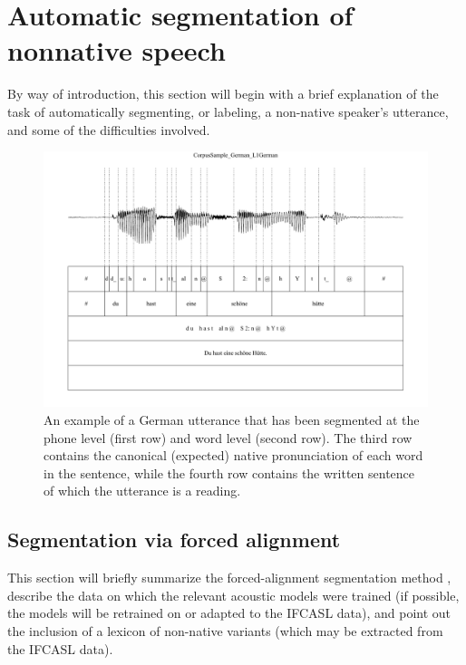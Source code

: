 \section{Automatic segmentation of nonnative speech}
\label{sec:diag:segmentation}

	By way of introduction, this section will begin with a brief explanation of the task of automatically segmenting, or labeling, a non-native speaker's utterance, and some of the difficulties involved.
	
	\begin{figure}
		\centering
		\includegraphics[width=\textwidth]{../img/screenshots/SampleGG-basic}
		\caption{An example of a German utterance that has been segmented at the phone level (first row) and word level (second row). The third row contains the canonical (expected) native pronunciation of each word in the sentence, while the fourth row contains the written sentence of which the utterance is a reading.}
		\label{fig:GGsegmentation}
	\end{figure}

	\subsection{Segmentation via forced alignment}
	\label{sec:segmentation:alignment}
	
	This section will briefly summarize the forced-alignment segmentation method \citep[etc.]{Fohr1996,Mesbahi2011}, describe the data on which the relevant acoustic models were trained (if possible, the models will be retrained on or adapted to the IFCASL data), and point out the inclusion of a lexicon of non-native variants (which may be extracted from the IFCASL data).
	
